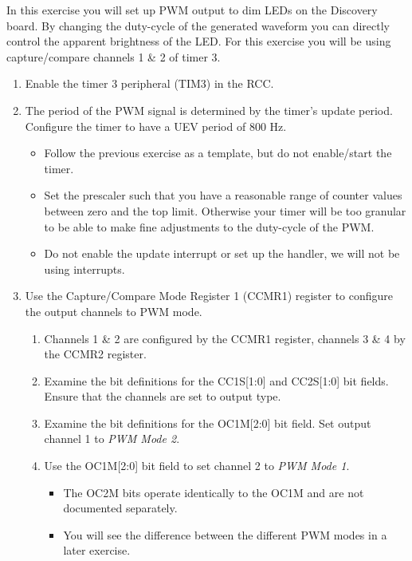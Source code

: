 \documentclass[openany,11pt,fleqn]{book} %
\begin{document}
\begin{exercise}
    \label{ex2}
    In this exercise you will set up PWM output to dim LEDs on the Discovery board. By changing the duty-cycle of the generated waveform you can directly control the apparent brightness of the LED. For this exercise you will be using capture/compare channels 1 \& 2 of timer 3. 
    
    \begin{enumerate}
        \item Enable the timer 3 peripheral (TIM3) in the RCC.
        \item The period of the PWM signal is determined by the timer's update period. Configure the timer to have a UEV period of 800 Hz.  
        \begin{itemize}
            \item Follow the previous exercise as a template, but do not enable/start the timer.
            \item Set the prescaler such that you have a reasonable range of counter values between zero and the top limit. Otherwise your timer will be too granular to be able to make fine adjustments to the duty-cycle of the PWM.
            \item Do not enable the update interrupt or set up the handler, we will not be using interrupts.
        \end{itemize}
        \item Use the Capture/Compare Mode Register 1 (CCMR1) register to configure the output channels to PWM mode.
        \begin{enumerate}
            \item Channels 1 \& 2 are configured by the CCMR1 register, channels 3 \& 4 by the CCMR2 register.
            \item Examine the bit definitions for the CC1S[1:0] and CC2S[1:0] bit fields. Ensure that the channels are set to output type. 
            \item Examine the bit definitions for the OC1M[2:0] bit field. Set output channel 1 to \textit{PWM Mode 2}.
            \item Use the OC1M[2:0] bit field to set channel 2 to \textit{PWM Mode 1}.
            \begin{itemize}
                \item The OC2M bits operate identically to the OC1M and are not documented separately. 
                \item You will see the difference between the different PWM modes in a later exercise.

\end{itemize}
\end{enumerate}
\end{enumerate}
\end{exercise}
\end{document}
